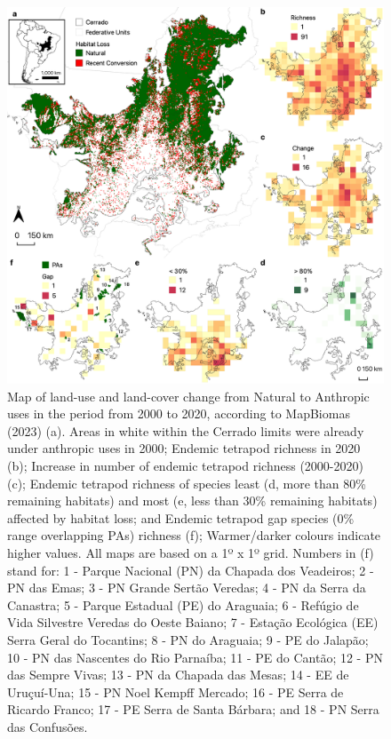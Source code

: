 \documentclass[12pt,openright,oneside,a4paper,english]{abntex2}
\begin{document}
\begin{figure}[H]
	\centering
	\includegraphics[width=160mm]{Fig c1-3}
	\caption[Habitat loss and Richness maps]{\small Map of land-use and land-cover change from Natural to Anthropic uses in the period from 2000 to 2020, according to MapBiomas (2023) (a). Areas in white within the Cerrado limits were already under anthropic uses in 2000; Endemic tetrapod richness in 2020 (b); Increase in number of endemic tetrapod richness (2000-2020) (c); Endemic tetrapod richness of species least (d, more than 80\% remaining habitats) and most (e, less than 30\% remaining habitats) affected by habitat loss; and Endemic tetrapod gap species (0\% range overlapping PAs) richness (f); Warmer/darker colours indicate higher values. All maps are based on a 1º x 1º grid. Numbers in (f) stand for: 1 - Parque Nacional (PN) da Chapada dos Veadeiros; 2 - PN das Emas; 3 - PN Grande Sertão Veredas; 4 - PN da Serra da Canastra; 5 - Parque Estadual (PE) do Araguaia; 6 - Refúgio de Vida Silvestre Veredas do Oeste Baiano; 7 - Estação Ecológica (EE) Serra Geral do Tocantins; 8 - PN do Araguaia; 9 - PE do Jalapão; 10 - PN das Nascentes do Rio Parnaíba; 11 - PE do Cantão; 12 - PN das Sempre Vivas; 13 - PN da Chapada das Mesas; 14 - EE de Uruçuí-Una; 15 - PN Noel Kempff Mercado; 16 - PE Serra de Ricardo Franco; 17 - PE Serra de Santa Bárbara; and 18 - PN Serra das Confusões.}
	\label{fig:fig1-3}
\end{figure}
\end{document}
